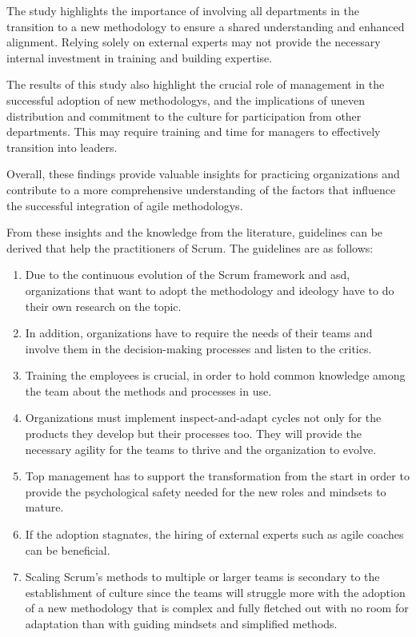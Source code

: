 The study highlights the importance of involving all departments in the \gls{transition} to a new \gls{methodology} to ensure a shared understanding and enhanced alignment. Relying solely on external experts may not provide the necessary internal investment in training and building expertise.

The results of this study also highlight the crucial role of management in the successful \gls{adoption} of new \glspl{methodology}, and the implications of uneven distribution and \gls{commitment} to the culture for participation from other departments. This may require training and time for managers to effectively \gls{transition} into leaders.

Overall, these findings provide valuable insights for practicing organizations and contribute to a more comprehensive understanding of the factors that influence the successful integration of \gls{agile} \glspl{methodology}. 

\newpage

From these insights and the knowledge from the literature, \glspl{guideline} can be derived that help the practitioners of Scrum. The \glspl{guideline} are as follows: 

\begin{enumerate}
    \item Due to the continuous evolution of the Scrum \gls{framework} and \ac{asd}, organizations that want to adopt the \gls{methodology} and \gls{ideology} have to do their own research on the topic.
    \item In addition, organizations have to require the needs of their teams and involve them in the decision-making processes and listen to the critics.
    \item Training the employees is crucial, in order to hold common knowledge among the team about the \glspl{method} and processes in use.
    \item Organizations must implement inspect-and-adapt cycles not only for the products they develop but their processes too. They will provide the necessary agility for the teams to thrive and the organization to evolve.
    \item Top management has to support the \gls{transformation} from the start in order to provide the psychological safety needed for the new roles and \glspl{mindset} to mature.
    \item If the \gls{adoption} stagnates, the hiring of external experts such as \gls{agile} coaches can be beneficial.
    \item Scaling Scrum's \glspl{method} to multiple or larger teams is secondary to the establishment of culture since the teams will struggle more with the \gls{adoption} of a new \gls{methodology} that is complex and fully fletched out with no room for \gls{adaptation} than with guiding \glspl{mindset} and simplified \glspl{method}.
\end{enumerate}

